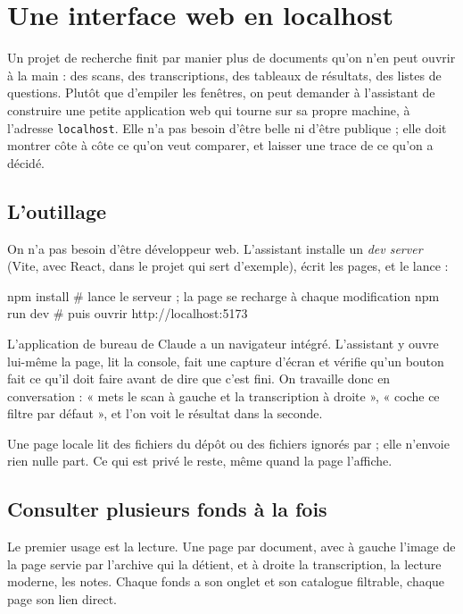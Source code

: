 \chapter{Une interface web en localhost}

Un projet de recherche finit par manier plus de documents qu'on n'en peut ouvrir à la
main : des scans, des transcriptions, des tableaux de résultats, des listes de questions.
Plutôt que d'empiler les fenêtres, on peut demander à l'assistant de construire une petite
application web qui tourne sur sa propre machine, à l'adresse \texttt{localhost}. Elle n'a
pas besoin d'être belle ni d'être publique ; elle doit montrer côte à côte ce qu'on veut
comparer, et laisser une trace de ce qu'on a décidé.

\section{L'outillage}

On n'a pas besoin d'être développeur web. L'assistant installe un \emph{dev server}
(Vite, avec React, dans le projet qui sert d'exemple), écrit les pages, et le lance :

\begin{terminal}
npm install
# lance le serveur ; la page se recharge à chaque modification
npm run dev
# puis ouvrir http://localhost:5173
\end{terminal}

L'application de bureau de Claude a un navigateur intégré. L'assistant y ouvre lui-même la
page, lit la console, fait une capture d'écran et vérifie qu'un bouton fait ce qu'il doit
faire avant de dire que c'est fini. On travaille donc en conversation : « mets le scan à
gauche et la transcription à droite », « coche ce filtre par défaut », et l'on voit le
résultat dans la seconde.

\begin{regle}
Une page locale lit des fichiers du dépôt ou des fichiers ignorés par 
; elle n'envoie rien nulle part. Ce qui est privé le reste, même quand la page l'affiche.
\end{regle}

\section{Consulter plusieurs fonds à la fois}

Le premier usage est la lecture. Une page par document, avec à gauche l'image de la page
servie par l'archive qui la détient, et à droite la transcription, la lecture moderne, les
notes. Chaque fonds a son onglet et son catalogue filtrable, chaque page son lien direct.

